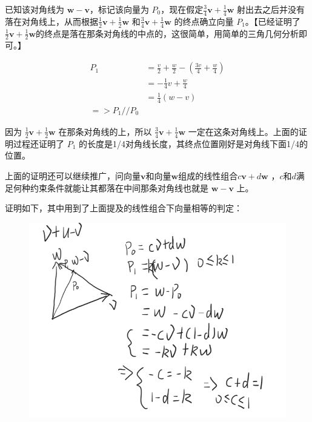 \documentclass[12pt,oneside]{book}
\begin{document}
已知该对角线为 $\boldsymbol{w} - \boldsymbol{v}$，标记该向量为 $P_0$，现在假定$\frac{3}{4}\boldsymbol{v} + \frac{1}{4}\boldsymbol{w}$ 射出去之后并没有落在对角线上，从而根据$\frac{1}{2}\boldsymbol{v} + \frac{1}{2}\boldsymbol{w}$ 和$\frac{3}{4}\boldsymbol{v} + \frac{1}{4}\boldsymbol{w}$ 的终点确立向量 $P_1$。【已经证明了$\frac{1}{2}\boldsymbol{v} + \frac{1}{2}\boldsymbol{w}$的终点是落在那条对角线的中点的，这很简单，用简单的三角几何分析即可。】

\begin{align*}
P_1 &= \frac{v}{2} + \frac{w}{2} - (\frac{3v}{4} + \frac{w}{4}) \\
    &= -\frac{1}{4}v + \frac{w}{4} \\
    &= \frac{1}{4}(w-v) \\    
 => P_1 // P_0
\end{align*}

因为 $\frac{1}{2}\boldsymbol{v} + \frac{1}{2}\boldsymbol{w}$ 在那条对角线的上，所以 $\frac{3}{4}\boldsymbol{v} + \frac{1}{4}\boldsymbol{w}$ 一定在这条对角线上。上面的证明过程还证明了 $P_1$ 的长度是1/4对角线长度，其终点位置刚好是对角线下面1/4的位置。

上面的证明还可以继续推广，问向量$\boldsymbol{v}$和向量$\boldsymbol{w}$组成的线性组合$c\boldsymbol{v} + d\boldsymbol{w}$ ，$c$和$d$满足何种约束条件就能让其都落在中间那条对角线也就是 $\boldsymbol{w} - \boldsymbol{v}$ 上。

证明如下，其中用到了上面提及的线性组合下向量相等的判定：

\begin{figure}[H]
\centering
\includegraphics[width=\linewidth ,totalheight=0.95\textheight , keepaspectratio]{线性代数引论问题集1_1_15_2.png}
\end{figure}
\end{document}
